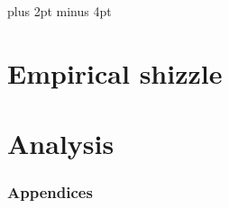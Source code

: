 \documentclass[a4paper,titlepage]{article}
\begin{document}
\parindent=0pt %
\parskip=8pt plus 2pt minus 4pt

\setcounter{page}{1}

\tableofcontents
\newpage

\begin{spacing}{1.15}


\pagebreak

\pagebreak
\part{Empirical shizzle}





\pagebreak
\part{Analysis}




\end{spacing}
\pagebreak


\newpage
\appendix
\section*{Appendices}


%
\end{document}

